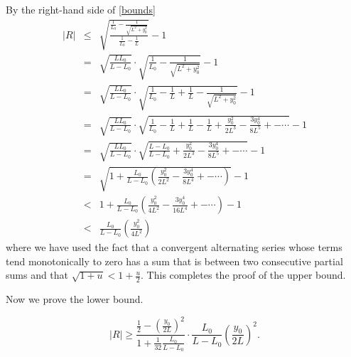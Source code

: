 \documentclass[12pt]{article}
\numberwithin{equation}{section}
\renewcommand{\geq}{\geqslant}  %
\renewcommand{\leq}{\leqslant}  %
\begin{document}
By the right-hand side of \eqref{bounds}
\begin{eqnarray*}
|R| & \leq & \sqrt{\frac{\frac{1}{L_0}-\frac{1}{\sqrt{L^2+y_0^2}}}{\frac{1}{L_0}-\frac{1}{L}}}-1 \\
 & = & \sqrt{\frac{LL_0}{L-L_0}}\cdot\sqrt{\frac{1}{L_0}-\frac{1}{\sqrt{L^2+y_0^2}}}-1\\
 & =&  \sqrt{\frac{LL_0}{L-L_0}}\cdot\sqrt{\frac{1}{L_0}-\frac{1}{L}+\frac{1}{L}-\frac{1}{\sqrt{L^2+y_0^2}}}-1\\
 & = &\sqrt{\frac{LL_0}{L-L_0}}\cdot\sqrt{\frac{1}{L_0}-\frac{1}{L}+\frac{1}{L}-\frac{1}{L}+\frac{y_0^2}{2L^3}-\frac{3y_0^4}{8L^5}+-\cdots}-1\\
 &=&\sqrt{\frac{LL_0}{L-L_0}}\cdot\sqrt{\frac{L-L_0}{L-L_0}+\frac{y_0^2}{2L^3}-\frac{3y_0^4}{8L^5}+-\cdots}-1\\
&=&\sqrt{1+\frac{L_0}{L-L_0}\left(\frac{y_0^2}{2L^2}-\frac{3y_0^4}{8L^4}+-\cdots\right)}-1\\
&<&1+\frac{L_0}{L-L_0}\left(\frac{y_0^2}{4L^2}-\frac{3y_0^4}{16L^4}+-\cdots\right)-1\\
&<&\frac{L_0}{L-L_0}\left(\frac{y_0^2}{4L^2}\right)
\end{eqnarray*}
where we have used the fact that a convergent alternating series whose terms tend monotonically to zero has a sum that is between two consecutive partial sums and that $\sqrt{1+u}<1+\frac{u}{2}.$
This completes the proof of the upper bound.

Now we prove the lower bound.

\begin{equation}
\label{lower bound}
|R|\geq\frac {\frac{1}{2}-\left(\frac{y_0}{2L}\right)^2}{1+\frac{1}{32}\frac{L_0}{L-L_0}}\cdot\frac{L_0}{L-L_0}\left(\frac{y_0}{2L}\right)^2.
\end{equation}
\end{document}
